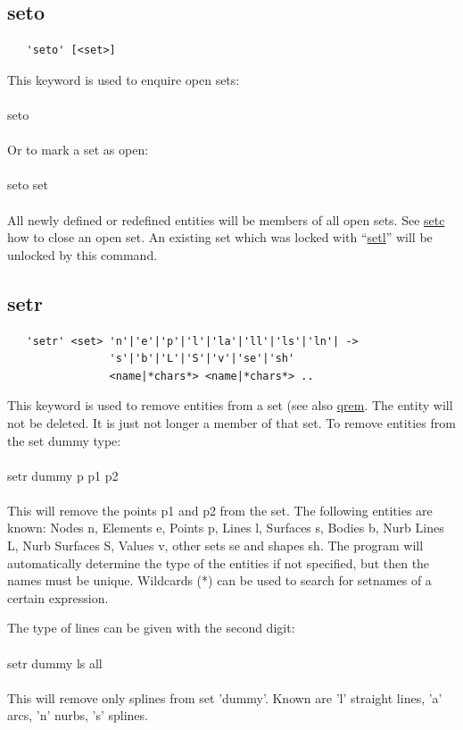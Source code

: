 \documentclass{article}
\providecommand{\htmlref}[2]{\hyperref[#2]{#1}}
\begin{document}
\subsection{\label{seto}seto}
\begin{verbatim}
   'seto' [<set>] 
\end{verbatim}
This keyword is used to enquire open sets:\\\\
seto\\\\
Or to mark a set as open:\\\\
seto set\\\\
All newly defined or redefined entities will be members of all open sets. See \htmlref{setc}{setc} how to close an open set. An existing set which was locked with ``\htmlref{setl}{setl}'' will be unlocked by this command.

\subsection{\label{setr}setr}
\begin{verbatim}
   'setr' <set> 'n'|'e'|'p'|'l'|'la'|'ll'|'ls'|'ln'| ->
                's'|'b'|'L'|'S'|'v'|'se'|'sh'
                <name|*chars*> <name|*chars*> .. 
\end{verbatim}
This keyword is used to remove entities from a set (see also \htmlref{qrem}{qrem}. The entity will not be deleted. It is just not longer a member of that set. To remove entities from the set dummy type:\\\\setr dummy p p1 p2\\\\This will remove the points p1 and p2 from the set. The following entities are known: Nodes n, Elements e, Points p, Lines l, Surfaces s, Bodies b, Nurb Lines L, Nurb Surfaces S, Values v, other sets se and shapes sh. The program will automatically determine the type of the entities if not specified, but then the names must be unique. Wildcards (*) can be used to search for setnames of a certain expression.

The type of lines can be given with the second digit:\\\\setr dummy ls
all\\\\This will remove only splines from set 'dummy'. Known are 'l' straight
lines, 'a' arcs, 'n' nurbs, 's' splines.
\end{document}
